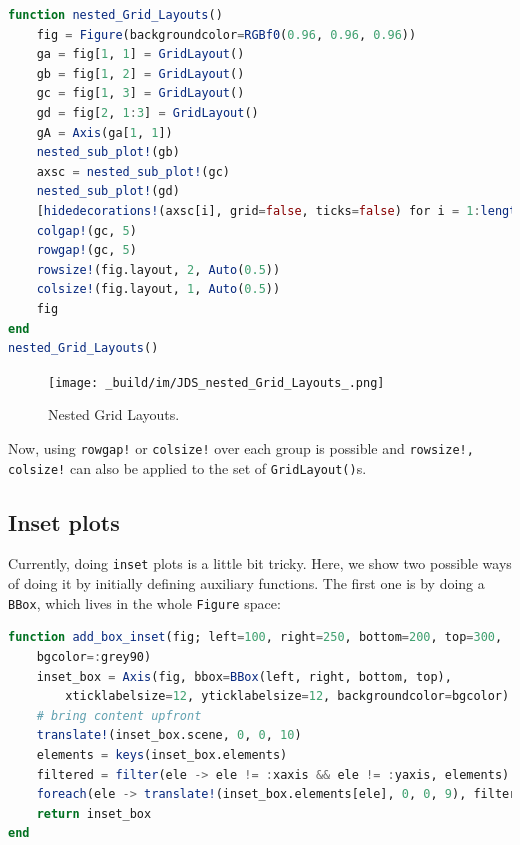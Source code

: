 \documentclass[
  notoc %
]{tufte-book}
\newcommand{\passthrough}[1]{#1}
\begin{document}
\begin{lstlisting}[language=Julia]
function nested_Grid_Layouts()
    fig = Figure(backgroundcolor=RGBf0(0.96, 0.96, 0.96))
    ga = fig[1, 1] = GridLayout()
    gb = fig[1, 2] = GridLayout()
    gc = fig[1, 3] = GridLayout()
    gd = fig[2, 1:3] = GridLayout()
    gA = Axis(ga[1, 1])
    nested_sub_plot!(gb)
    axsc = nested_sub_plot!(gc)
    nested_sub_plot!(gd)
    [hidedecorations!(axsc[i], grid=false, ticks=false) for i = 1:length(axsc)]
    colgap!(gc, 5)
    rowgap!(gc, 5)
    rowsize!(fig.layout, 2, Auto(0.5))
    colsize!(fig.layout, 1, Auto(0.5))
    fig
end
nested_Grid_Layouts()
\end{lstlisting}

\begin{figure}
\hypertarget{fig:nested_Grid_Layouts}{%
\centering
\texttt{[image: \_build/im/JDS\_nested\_Grid\_Layouts\_.png]}
\caption{Nested Grid Layouts.}\label{fig:nested_Grid_Layouts}
}
\end{figure}

Now, using \passthrough{\lstinline"rowgap!"} or
\passthrough{\lstinline"colsize!"} over each group is possible and
\passthrough{\lstinline"rowsize!, colsize!"} can also be applied to the
set of \passthrough{\lstinline!GridLayout()!}s.

\hypertarget{inset-plots}{%
\subsection{Inset plots}\label{inset-plots}}

Currently, doing \passthrough{\lstinline!inset!} plots is a little bit
tricky. Here, we show two possible ways of doing it by initially
defining auxiliary functions. The first one is by doing a
\passthrough{\lstinline!BBox!}, which lives in the whole
\passthrough{\lstinline!Figure!} space:

\begin{lstlisting}[language=Julia]
function add_box_inset(fig; left=100, right=250, bottom=200, top=300,
    bgcolor=:grey90)
    inset_box = Axis(fig, bbox=BBox(left, right, bottom, top),
        xticklabelsize=12, yticklabelsize=12, backgroundcolor=bgcolor)
    # bring content upfront
    translate!(inset_box.scene, 0, 0, 10)
    elements = keys(inset_box.elements)
    filtered = filter(ele -> ele != :xaxis && ele != :yaxis, elements)
    foreach(ele -> translate!(inset_box.elements[ele], 0, 0, 9), filtered)
    return inset_box
end
\end{lstlisting}
\end{document}
